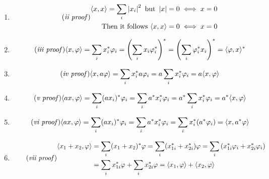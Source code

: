 \documentclass[11pt,letterpaper]{article}%
\newcommand\abs[1]{\left|#1\right|}
\newcommand\inn[2]{\langle#1,#2\rangle}
\begin{document}
\begin{enumerate}[label=\Large{\textbf{\arabic*.}}]
{\begin{enumerate}[label=Proof for \textit{\roman*.}]
\item{
\begin{equation}
\label{inn2p}\tag{\textit{ii proof}}
\begin{split}
\inn{x}{x} = \sum_i \abs{x_i}^2\text{ but } \abs{x} = 0 \iff x = 0 \\
\text{Then it follows }\inn{x}{x} = 0 \iff x = 0
\end{split}
\end{equation}
}

\item{
\begin{equation}
\label{inn3p}\tag{\textit{iii proof}}
\inn{x}{\varphi} = \sum_i x_i^*\varphi_i = \left(\sum_i x_i\varphi_i^*\right)^* = \left(\sum_i \varphi_i^*x_i\right)^* = \inn{\varphi}{x}^*
\end{equation}
}

\item{
\begin{equation}
\label{inn4p}\tag{\textit{iv proof}}
\inn{x}{a\varphi} = \sum_i x_i^*a\varphi_i = a\sum_i x_i^*\varphi_i = a\inn{x}{\varphi}
\end{equation}
}

\item{
\begin{equation}
\label{inn5p}\tag{\textit{v proof}}
\inn{ax}{\varphi} = \sum_i (ax_i)^*\varphi_i = \sum_i a^*x_i^*\varphi_i = a^*\sum_i x_i^*\varphi_i = a^*\inn{x}{\varphi}
\end{equation}
}

\item{
\begin{equation}
\label{inn6p}\tag{\textit{vi proof}}
\inn{ax}{\varphi} = \sum_i (ax_i)^*\varphi_i = \sum_i a^*x_i^*\varphi_i = \sum_i x_i^*(a^*\varphi_i) = \inn{x}{a^*\varphi}
\end{equation}
}

\item{
\begin{equation}
\label{inn7p}\tag{\textit{vii proof}}
\begin{split}
\inn{x_1 + x_2}{\varphi} &= \sum_i(x_1 + x_2)^*\varphi = \sum_i(x_{1i}^* + x_{2i}^*)\varphi = \sum_i\left( x_{1i}^*\varphi_i + x_{2i}^*\varphi_i \right)\\
&= \sum_i x_{1i}^*\varphi + \sum_i x_{2i}^*\varphi = \inn{x_1}{\varphi} + \inn{x_2}{\varphi}
\end{split}
\end{equation}
}
\end{enumerate}
\setcounter{equation}{1}
}


\end{enumerate}
\end{document}

